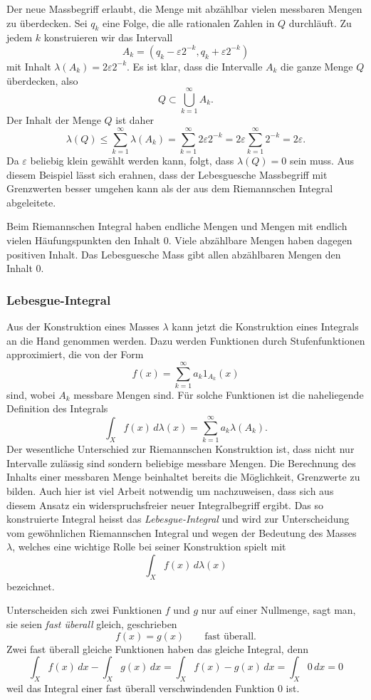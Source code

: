Der neue Massbegriff erlaubt, die Menge mit abzählbar vielen messbaren
Mengen zu überdecken.
Sei $q_k$ eine Folge, die alle rationalen Zahlen in $Q$ durchläuft.
Zu jedem $k$ konstruieren wir das Intervall
\[
A_k = (q_k-\varepsilon2^{-k},q_k+\varepsilon2^{-k})
\]
mit Inhalt $\lambda(A_k) = 2\varepsilon2^{-k}$.
Es ist klar, dass die Intervalle $A_k$ die ganze Menge $Q$ überdecken,
also
\[
Q\subset \bigcup_{k=1}^\infty A_k.
\]
Der Inhalt der Menge $Q$ ist daher
\[
\lambda(Q)
\le
\sum_{k=1}^\infty \lambda(A_k)
=
\sum_{k=1}^\infty 2\varepsilon 2^{-k}
=
2\varepsilon
\sum_{k=1}^\infty 2^{-k}
=
2\varepsilon.
\]
Da $\varepsilon$ beliebig klein gewählt werden kann, folgt, dass
$\lambda(Q)=0$ sein muss.
Aus diesem Beispiel lässt sich erahnen, dass der Lebesguesche Massbegriff
mit Grenzwerten besser umgehen kann als der aus dem Riemannschen Integral
abgeleitete.

Beim Riemannschen Integral haben endliche Mengen und Mengen mit endlich
vielen Häufungspunkten den Inhalt $0$.
Viele abzählbare Mengen haben dagegen positiven Inhalt.
Das Lebesguesche Mass gibt allen abzählbaren Mengen den Inhalt 0.

%
%
\subsubsection{Lebesgue-Integral}
Aus der Konstruktion eines Masses $\lambda$ kann jetzt die Konstruktion
eines Integrals an die Hand genommen werden.
Dazu werden Funktionen durch Stufenfunktionen approximiert, die
von der Form
\[
f(x) = \sum_{k=1}^\infty a_k 1_{A_k}(x)
\]
sind, wobei $A_k$ messbare Mengen sind.
Für solche Funktionen ist die naheliegende Definition des Integrals
\[
\int_X f(x)\,d\lambda(x)
=
\sum_{k=1}^\infty a_k \lambda(A_k).
\]
Der wesentliche Unterschied zur Riemannschen Konstruktion ist,
dass nicht nur Intervalle zulässig sind sondern beliebige messbare Mengen.
Die Berechnung des Inhalts einer messbaren Menge beinhaltet bereits
die Möglichkeit, Grenzwerte zu bilden.
Auch hier ist viel Arbeit notwendig um nachzuweisen, dass sich aus diesem
Ansatz ein widerspruchsfreier neuer Integralbegriff ergibt.
Das so konstruierte Integral heisst das {\em Lebesgue-Integral} und
%
wird zur Unterscheidung vom gewöhnlichen Riemannschen Integral und
wegen der Bedeutung des Masses $\lambda$, welches eine wichtige Rolle
bei seiner Konstruktion spielt mit
\[
\int_X f(x) \,d\lambda(x)
\]
bezeichnet.

Unterscheiden sich zwei Funktionen $f$ und $g$ nur auf einer Nullmenge,
sagt man, sie seien {\em fast überall} gleich, geschrieben
%
\[
f(x) = g(x) \qquad \text{fast überall}.
\]
Zwei fast überall gleiche Funktionen haben das gleiche Integral, denn
\[
\int_X f(x)\,dx - \int_X g(x)\,dx
=
\int_X f(x)-g(x)\,dx
=
\int_X 0\,dx=0
\]
weil das Integral einer fast überall verschwindenden Funktion $0$ ist.

